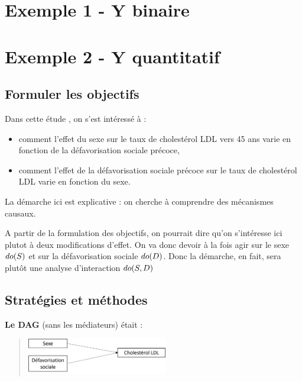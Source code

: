 \documentclass[
]{book}
\providecommand{\tightlist}{%
  \setlength{\itemsep}{0pt}\setlength{\parskip}{0pt}}
\begin{document}
\hypertarget{exemple-1---y-binaire}{%
\chapter{Exemple 1 - Y binaire}\label{exemple-1---y-binaire}}

\hypertarget{exemple-2---y-quantitatif}{%
\chapter{Exemple 2 - Y quantitatif}\label{exemple-2---y-quantitatif}}

\hypertarget{formuler-les-objectifs}{%
\section{Formuler les objectifs}\label{formuler-les-objectifs}}

Dans cette étude \citet{colineaux2023explaining}, on s'est intéressé à :

\begin{itemize}
\tightlist
\item
  comment l'effet du sexe sur le taux de cholestérol LDL vers 45 ans varie en fonction de la défavorisation sociale précoce,
\item
  comment l'effet de la défavorisation sociale précoce sur le taux de cholestérol LDL varie en fonction du sexe.
\end{itemize}

La démarche ici est explicative : on cherche à comprendre des mécanismes causaux.

A partir de la formulation des objectifs, on pourrait dire qu'on s'intéresse ici plutot à deux modifications d'effet.
On va donc devoir à la fois agir sur le sexe \(\small do(S)\) et sur la défavorisation sociale \(\small do(D)\).
Donc la démarche, en fait, sera plutôt une analyse d'interaction \(\small do(S,D)\)

\hypertarget{stratuxe9gies-et-muxe9thodes}{%
\section{Stratégies et méthodes}\label{stratuxe9gies-et-muxe9thodes}}

\textbf{Le DAG} (sans les médiateurs) était :

\begin{quote}
\includegraphics[width=0.5\textwidth,height=\textheight]{img/Image13.png}
\end{quote}
\end{document}
